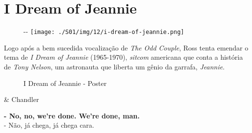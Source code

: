 \hypertarget{i-dream-of-jeannie}{%
\section{I Dream of Jeannie}\label{i-dream-of-jeannie}}

\begin{figure}[!ht]
  \begin{adjustwidth}{-\oddsidemargin-1in}{-\rightmargin}
    \centering
    \texttt{[image: ./S01/img/12/i-dream-of-jeannie.png]}
  \end{adjustwidth}
\end{figure}

Logo após a bem sucedida vocalização de \emph{The Odd Couple}, Ross
tenta emendar o tema de \emph{I Dream of Jeannie} (1965-1970),
\emph{sitcom} americana que conta a história de \emph{Tony Nelson}, um
astronauta que liberta um gênio da garrafa, \emph{Jeannie}.

\begin{figure}
  \centering
    \caption{I Dream of Jeannie - Poster\label{fig:i-dream-of-jeannie-poster}}
\end{figure}

\begin{tcolorbox}[enhanced,center upper,
    drop fuzzy shadow southeast, boxrule=0.3pt,
    lower separated=false, breakable,
    colframe=black!30!dialogoBorder,colback=white]
\begin{minipage}[c]{0.16\linewidth}
   & \centering \scriptsize{Chandler}
\end{minipage}
\hfill
\begin{minipage}[c]{0.8\linewidth}
  \textbf{- No, no, we're done. We're done, man.}\\
  - Não, já chega, já chega cara.
\end{minipage}
\end{tcolorbox}

